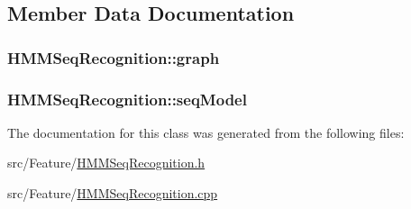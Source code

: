\subsection{Member Data Documentation}
\hypertarget{class_h_m_m_seq_recognition_a7102c5c76a993fd7ecaa84398c5fc524}{
\subsubsection[{graph}]{ H\+M\+M\+Seq\+Recognition\+::graph\hspace{0.3cm}{\ttfamily [private]}}}\label{class_h_m_m_seq_recognition_a7102c5c76a993fd7ecaa84398c5fc524}
\hypertarget{class_h_m_m_seq_recognition_a36ede5e827ea9429c0997ef78726941f}{
\subsubsection[{seq\+Model}]{ H\+M\+M\+Seq\+Recognition\+::seq\+Model\hspace{0.3cm}{\ttfamily [private]}}}\label{class_h_m_m_seq_recognition_a36ede5e827ea9429c0997ef78726941f}


The documentation for this class was generated from the following files\+:\begin{DoxyCompactItemize}
\item 
src/\+Feature/\hyperlink{_h_m_m_seq_recognition_8h}{H\+M\+M\+Seq\+Recognition.\+h}\item 
src/\+Feature/\hyperlink{_h_m_m_seq_recognition_8cpp}{H\+M\+M\+Seq\+Recognition.\+cpp}\end{DoxyCompactItemize}
